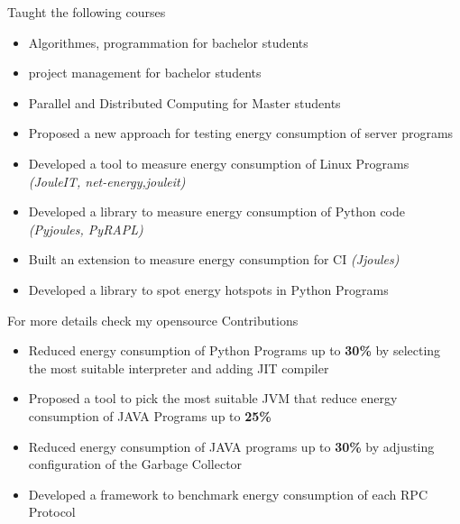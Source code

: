 \documentclass[10pt,a4paper,ragged2e,withhyper]{altacv}
\begin{document}
\begin{paracol}{2}
  \medskip

  Taught the following courses
  \begin{itemize}
    \item Algorithmes, programmation for bachelor students
    \item project management for bachelor students
    \item Parallel and Distributed Computing for Master students
  \end{itemize}
  \divider
  \begin{itemize}
    \item Proposed a new approach for testing energy consumption of server programs
    \item Developed a tool to measure energy consumption of Linux Programs \emph{(JouleIT, net-energy,jouleit)}
    \item Developed a library to measure energy consumption of Python code \emph{(Pyjoules, PyRAPL)}
    \item Built an extension to measure energy consumption for CI \emph{(Jjoules)}
    \item Developed a library to spot energy hotspots in Python Programs
  \end{itemize}
  For more details check my opensource Contributions
  \\
  \begin{itemize}
    \item Reduced energy consumption of Python Programs up to \textbf{30\%} by selecting the most suitable interpreter and adding JIT compiler
    \item Proposed a tool to pick the most suitable JVM that reduce energy consumption of JAVA Programs up to \textbf{25\%}
    \item Reduced energy consumption of JAVA programs up to \textbf{30\%} by adjusting configuration of the Garbage Collector
  \end{itemize}
  \begin{itemize}
    \item Developed a framework to benchmark energy consumption of each RPC Protocol

\end{itemize}
\end{paracol}
\end{document}
